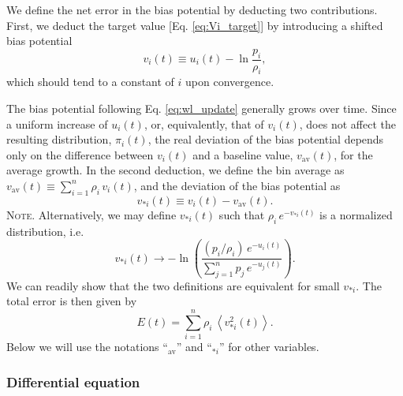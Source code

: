 \documentclass[reprint, superscriptaddress, floatfix]{revtex4-1}
\newcommand{\note}[1]{{\color{DarkGreen}\footnotesize \textsc{Note.} #1}}
\newcommand{\Err}{E}
\newcommand{\bav}[1]{#1_\mathrm{av}}
\begin{document}
We define the net error in the bias potential
by deducting two contributions.
%
First, we deduct the target value
[Eq. \eqref{eq:Vi_target}]
by introducing a shifted bias potential
%
\begin{equation}
  v_i(t)
  \equiv
  u_i(t)
  -
  \ln \frac { p_i }
            { \rho_i }
  ,
  \label{eq:v_def}
\end{equation}
%
which should tend to a constant of $i$
upon convergence.


The bias potential following Eq. \eqref{eq:wl_update}
generally grows over time.
%
Since a uniform increase of $u_i(t)$, or, equivalently, that of $v_i(t)$,
does not affect the resulting distribution, $\pi_i(t)$,
the real deviation of the bias potential
depends only on the difference between $v_i(t)$
and a baseline value, $\bav{v}(t)$,
for the average growth.\cite{
dama2014}
%
In the second deduction, we define
the bin average as $\bav{v}(t) \equiv \sum_{i=1}^n \rho_i \, v_i(t)$,
and the deviation of the bias potential as
%
\begin{equation}
  v_{*i}(t) \equiv v_i(t) - \bav{v}(t)
  .
\label{eq:x_def}
\end{equation}
%
\note{Alternatively,
  we may define $v_{*i}(t)$ such that
  $\rho_i \, e^{-v_{*i}(t)}$ is a normalized distribution,
  i.e.
  $$
  v_{*i}(t) \to -\ln\left(
    \frac{ (p_i/\rho_i) \, e^{ -u_i(t) } }
    { \sum_{j=1}^n p_j \, e^{ -u_j(t) } }
  \right).
  $$
  We can readily show that the two definitions are equivalent
  for small $v_{*i}$.}%
%
The total error is then given by
%
\begin{equation}
  \Err(t)
  =
  \sum_{i = 1}^n \rho_i \,
  \left\langle v_{*i}^2(t) \right\rangle
  .
\label{eq:error_def}
\end{equation}
%
Below we will use the notations ``$\bav{}$'' and ``$_{*i}$''
for other variables.




\subsubsection{\label{sec:sbin_diffeq}
Differential equation}
\end{document}
